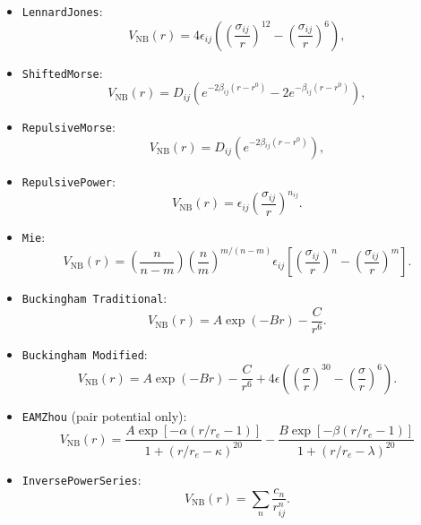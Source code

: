 \documentclass[]{book}
\begin{document}
\begin{itemize}
\item {\tt LennardJones}:
\begin{equation*}
V_{\text{NB}}(r) = 4 \epsilon_{ij} \left(
  \left(\frac{\sigma_{ij}}{r} \right)^{12} -
  \left(\frac{\sigma_{ij}}{r} \right)^{6} \right),
\end{equation*}
\item {\tt ShiftedMorse}:
\begin{equation*}
 V_{\text{NB}}(r) = D_{ij} \left( e^{-2 \beta_{ij} (r -
     r^0)} - 2 e^{- \beta_{ij} (r -
     r^0)} \right),
\end{equation*}
\item {\tt RepulsiveMorse}:
\begin{equation*}
 V_{\text{NB}}(r) = D_{ij} \left( e^{-2 \beta_{ij} (r -
     r^0)} \right),
\end{equation*}
\item {\tt RepulsivePower}:
\begin{equation*}
  V_{\text{NB}}(r) = \epsilon_{ij}
  \left(\frac{\sigma_{ij}}{r} \right)^{n_{ij}}.
\end{equation*}
\item {\tt Mie}:
\begin{equation*}
  V_{\text{NB}}(r) =  \left(\frac{n}{n-m}\right)
  \left(\frac{n}{m}\right)^{m/(n-m)} \epsilon_{ij} \left[
  \left(\frac{\sigma_{ij}}{r} \right)^{n} -
  \left(\frac{\sigma_{ij}}{r} \right)^{m} \right].
\end{equation*}
\item {\tt Buckingham Traditional}:
\begin{equation*}
  V_{\text{NB}}(r) =  A \exp( -B r) - \frac{C}{r^6}.
\end{equation*}
\item {\tt Buckingham Modified}:
\begin{equation*}
  V_{\text{NB}}(r) = A \exp( -B r) - \frac{C}{r^6} + 4 \epsilon \left( \left( \frac{\sigma}{r} \right)^30 - \left( \frac{\sigma}{r} \right)^6 \right).
\end{equation*}
\item {\tt EAMZhou} (pair potential only):
\begin{equation*}
  V_{\text{NB}}(r) = \frac{ A \exp\left[-\alpha (r/r_e -1)\right]}{1+(r/r_e - \kappa)^{20}} -  \frac{ B \exp\left[-\beta (r/r_e -1)\right]}{1+(r/r_e - \lambda)^{20}}
\end{equation*}
\item {\tt InversePowerSeries}:
\begin{equation*}
  V_{\text{NB}}(r) = \sum_{n} \frac{ c_n }{ r_{ij}^n}.
\end{equation*}

\end{itemize}
\end{document}
